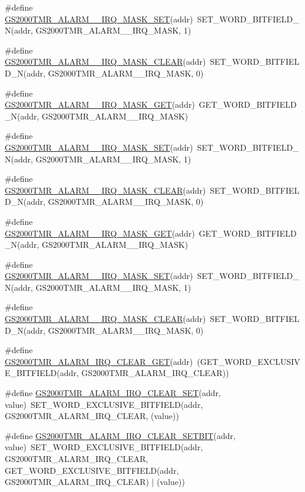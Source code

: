 \begin{DoxyCompactItemize}
\item 
\#define \hyperlink{a00555_aa06ae636b99c9d234c250ff0db4d7266}{GS2000TMR\_\-ALARM\_\_\-IRQ\_\-MASK\_\-SET}(addr)~SET\_\-WORD\_\-BITFIELD\_\-N(addr, GS2000TMR\_\-ALARM\_\_\-IRQ\_\-MASK, 1)
\item 
\#define \hyperlink{a00555_ae6a3f772dc9fcafa4d4c3d6d423041b2}{GS2000TMR\_\-ALARM\_\_\-IRQ\_\-MASK\_\-CLEAR}(addr)~SET\_\-WORD\_\-BITFIELD\_\-N(addr, GS2000TMR\_\-ALARM\_\_\-IRQ\_\-MASK, 0)
\item 
\#define \hyperlink{a00555_ac4d3fbe6b8b0625e770a1d83923cc1a5}{GS2000TMR\_\-ALARM\_\_\-IRQ\_\-MASK\_\-GET}(addr)~GET\_\-WORD\_\-BITFIELD\_\-N(addr, GS2000TMR\_\-ALARM\_\_\-IRQ\_\-MASK)
\item 
\#define \hyperlink{a00555_ad94430d9b13da38bac1ade2404770f01}{GS2000TMR\_\-ALARM\_\_\-IRQ\_\-MASK\_\-SET}(addr)~SET\_\-WORD\_\-BITFIELD\_\-N(addr, GS2000TMR\_\-ALARM\_\_\-IRQ\_\-MASK, 1)
\item 
\#define \hyperlink{a00555_aed6e6ab75ceb5a3cf32e9923768218f8}{GS2000TMR\_\-ALARM\_\_\-IRQ\_\-MASK\_\-CLEAR}(addr)~SET\_\-WORD\_\-BITFIELD\_\-N(addr, GS2000TMR\_\-ALARM\_\_\-IRQ\_\-MASK, 0)
\item 
\#define \hyperlink{a00555_a457102de8bf514ccbb2abf8cf736f9ca}{GS2000TMR\_\-ALARM\_\_\-IRQ\_\-MASK\_\-GET}(addr)~GET\_\-WORD\_\-BITFIELD\_\-N(addr, GS2000TMR\_\-ALARM\_\_\-IRQ\_\-MASK)
\item 
\#define \hyperlink{a00555_a63b5941e43ed014034b90e87feee846b}{GS2000TMR\_\-ALARM\_\_\-IRQ\_\-MASK\_\-SET}(addr)~SET\_\-WORD\_\-BITFIELD\_\-N(addr, GS2000TMR\_\-ALARM\_\_\-IRQ\_\-MASK, 1)
\item 
\#define \hyperlink{a00555_a2cf9f570d208a6663c24670a5a5716d8}{GS2000TMR\_\-ALARM\_\_\-IRQ\_\-MASK\_\-CLEAR}(addr)~SET\_\-WORD\_\-BITFIELD\_\-N(addr, GS2000TMR\_\-ALARM\_\_\-IRQ\_\-MASK, 0)
\item 
\#define \hyperlink{a00555_a38524b732784c0c35cae949bbf52be91}{GS2000TMR\_\-ALARM\_\-IRQ\_\-CLEAR\_\-GET}(addr)~(GET\_\-WORD\_\-EXCLUSIVE\_\-BITFIELD(addr, GS2000TMR\_\-ALARM\_\-IRQ\_\-CLEAR))
\item 
\#define \hyperlink{a00555_af29b33e008a25b7d859cf18538bd45da}{GS2000TMR\_\-ALARM\_\-IRQ\_\-CLEAR\_\-SET}(addr, value)~SET\_\-WORD\_\-EXCLUSIVE\_\-BITFIELD(addr, GS2000TMR\_\-ALARM\_\-IRQ\_\-CLEAR, (value))
\item 
\#define \hyperlink{a00555_a3bb4dc95c973f54afa4ff4818b2ba89e}{GS2000TMR\_\-ALARM\_\-IRQ\_\-CLEAR\_\-SETBIT}(addr, value)~SET\_\-WORD\_\-EXCLUSIVE\_\-BITFIELD(addr, GS2000TMR\_\-ALARM\_\-IRQ\_\-CLEAR, GET\_\-WORD\_\-EXCLUSIVE\_\-BITFIELD(addr, GS2000TMR\_\-ALARM\_\-IRQ\_\-CLEAR) $|$ (value))

\end{DoxyCompactItemize}
